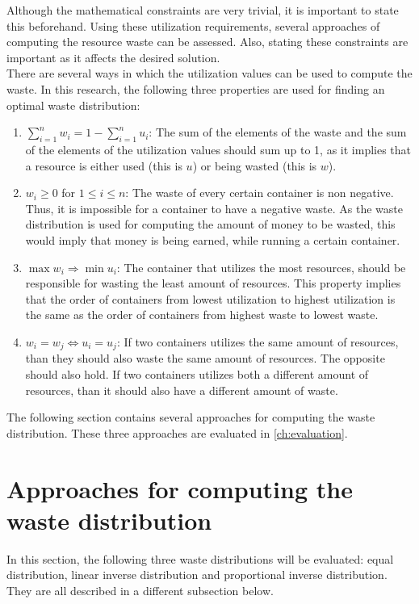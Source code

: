 \noindent
Although the mathematical constraints are very trivial, it is important to state this beforehand. Using these utilization requirements, several approaches of computing the resource waste can be assessed. Also, stating these constraints are important as it affects the desired solution.\\

\noindent
There are several ways in which the utilization values can be used to compute the waste. In this research, the following three properties are used for finding an optimal waste distribution:
\begin{enumerate}
    \item \textbf{$\sum_{i=1}^n w_i = 1 - \sum_{i=1}^n u_i $}: The sum of the elements of the waste and the sum of the elements of the utilization values should sum up to 1, as it implies that a resource is either used (this is $u$) or being wasted (this is $w$).
    \item \textbf{$w_i \geq 0$} for $1 \leq i \leq n$: The waste of every certain container is non negative. Thus, it is impossible for a container to have a negative waste. As the waste distribution is used for computing the amount of money to be wasted, this would imply that money is being earned, while running a certain container.
    \item \textbf{$\max w_i \Rightarrow \min u_i$}: The container that utilizes the most resources, should be responsible for wasting the least amount of resources. This property implies that the order of containers from lowest utilization to highest utilization is the same as the order of containers from highest waste to lowest waste. 
    \item \textbf{$w_i = w_j \iff u_i = u_j$}: If two containers utilizes the same amount of resources, than they should also waste the same amount of resources. The opposite should also hold. If two containers utilizes both a different amount of resources, than it should also have a different amount of waste.
\end{enumerate}

\noindent
The following section contains several approaches for computing the waste distribution. These three approaches are evaluated in \autoref{ch:evaluation}.

\section{Approaches for computing the waste distribution} \label{sec:approaches}
In this section, the following three waste distributions will be evaluated: equal distribution, linear inverse distribution and proportional inverse distribution. They are all described in a different subsection below.

